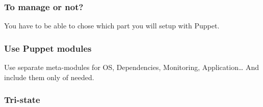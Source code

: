 \begin{frame}
    \frametitle{To manage or not?}
    \huge You have to be able to chose which part you will setup with Puppet.
\end{frame}
\begin{frame}
    \frametitle{Use Puppet modules}
    \huge Use separate meta-modules for OS, Dependencies, Monitoring, Application\dots{} And include them only of needed.
\end{frame}

\begin{frame}
    \frametitle{Tri-state}


\end{frame}














